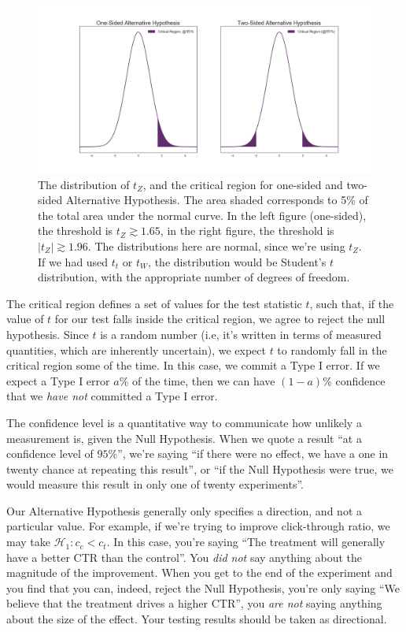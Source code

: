 \documentclass{article}
\numberwithin{equation}{section}
\begin{document}
\begin{figure}[h]
	\includegraphics[scale=0.35]{one_two_sided}
	\centering
	\captionsetup{width=0.6\textwidth}
	\caption{\label{fig_one_two_sided} The distribution of $t_Z$, and the critical region for one-sided and two-sided Alternative Hypothesis. The area shaded corresponds to 5\% of the total area under the normal curve. In the left figure (one-sided), the threshold is $t_Z \gtrsim 1.65$, in the right figure, the threshold is $\left|t_Z\right| \gtrsim 1.96$. The distributions here are normal, since we're using $t_Z$. If we had used $t_t$ or $t_W$, the distribution would be Student's $t$ distribution, with the appropriate number of degrees of freedom.}
\end{figure}

The critical region defines a set of values for the test statistic $t$, such that, if the value of $t$ for our test falls inside the critical region, we agree to reject the null hypothesis. Since $t$ is a random number (i.e, it's written in terms of measured quantities, which are inherently uncertain), we expect $t$ to randomly fall in the critical region some of the time. In this case, we commit a Type I error. If we expect a Type I error $a\%$ of the time, then we can have $(1-a)\%$ confidence that we \textit{have not} committed a Type I error.

The confidence level is a quantitative way to communicate how unlikely a measurement is, given the Null Hypothesis. When we quote a result ``at a confidence level of $95\%$'', we're saying ``if there were no effect, we have a one in twenty chance at repeating this result'', or ``if the Null Hypothesis were true, we would measure this result in only one of twenty experiments''. 

Our Alternative Hypothesis generally only specifies a direction, and not a particular value. For example, if we're trying to improve click-through ratio, we may take $\mathcal{H}_1: c_c < c_t$. In this case, you're saying ``The treatment will generally have a better CTR than the control''. You \textit{did not} say anything about the magnitude of the improvement. When you get to the end of the experiment and you find that you can, indeed, reject the Null Hypothesis, you're only saying ``We believe that the treatment drives a higher CTR'', you \textit{are not} saying anything about the size of the effect. Your testing results should be taken as directional.
\end{document}
